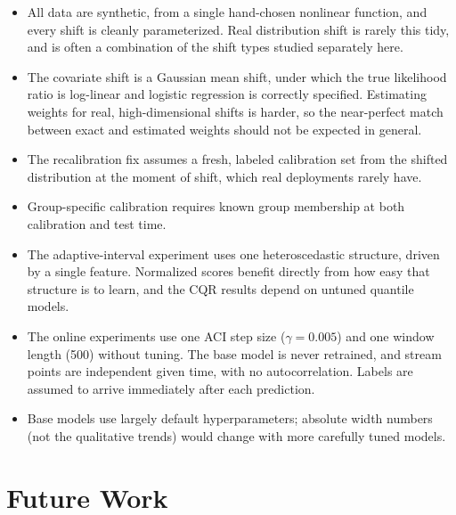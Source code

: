 \documentclass[11pt]{article}
\begin{document}
\begin{itemize}
  \item All data are synthetic, from a single hand-chosen nonlinear function, and
    every shift is cleanly parameterized. Real distribution shift is rarely this
    tidy, and is often a combination of the shift types studied separately here.
  \item The covariate shift is a Gaussian mean shift, under which the true
    likelihood ratio is log-linear and logistic regression is correctly specified.
    Estimating weights for real, high-dimensional shifts is harder, so the near-perfect
    match between exact and estimated weights should not be expected in general.
  \item The recalibration fix assumes a fresh, labeled calibration set from the
    shifted distribution at the moment of shift, which real deployments rarely have.
  \item Group-specific calibration requires known group membership at both
    calibration and test time.
  \item The adaptive-interval experiment uses one heteroscedastic structure, driven
    by a single feature. Normalized scores benefit directly from how easy that
    structure is to learn, and the CQR results depend on untuned quantile models.
  \item The online experiments use one ACI step size ($\gamma = 0.005$) and one
    window length (500) without tuning. The base model is never retrained, and
    stream points are independent given time, with no autocorrelation. Labels are
    assumed to arrive immediately after each prediction.
  \item Base models use largely default hyperparameters; absolute width numbers (not
    the qualitative trends) would change with more carefully tuned models.
\end{itemize}

\section{Future Work}
\end{document}

